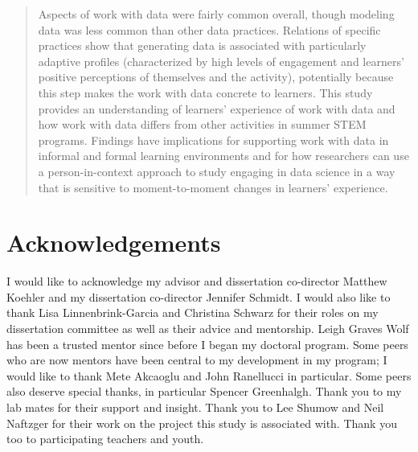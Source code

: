 \documentclass[]{msu-thesis}
\theoremstyle{definition}
\theoremstyle{definition}
\theoremstyle{definition}
\theoremstyle{remark}
\begin{document}
\begin{abstract}
Aspects of work with data were fairly common overall, though modeling data was less common than other data practices. Relations of specific practices show that generating data is associated with particularly adaptive profiles (characterized by high levels of engagement and learners' positive perceptions of themselves and the activity), potentially because this step makes the work with data concrete to learners. This study provides an understanding of learners' experience of work with data and how work with data differs from other activities in summer STEM programs. Findings have implications for supporting work with data in informal and formal learning environments and for how researchers can use a person-in-context approach to study engaging in data science in a way that is sensitive to moment-to-moment changes in learners' experience.

\end{abstract}

\clearpage

\makecopyrightpage

%
\makededicationpage
%
\clearpage

\chapter*{Acknowledgements}
\DoubleSpacing %
I would like to acknowledge my advisor and dissertation co-director Matthew Koehler and my dissertation co-director Jennifer Schmidt. I would also like to thank Lisa Linnenbrink-Garcia and Christina Schwarz for their roles on my dissertation committee as well as their advice and mentorship. Leigh Graves Wolf has been a trusted mentor since before I began my doctoral program. Some peers who are now mentors have been central to my development in my program; I would like to thank Mete Akcaoglu and John Ranellucci in particular. Some peers also deserve special thanks, in particular Spencer Greenhalgh. Thank you to my lab mates for their support and insight. Thank you to Lee Shumow and Neil Naftzger for their work on the project this study is associated with. Thank you too to participating teachers and youth.
\clearpage
\end{document}
